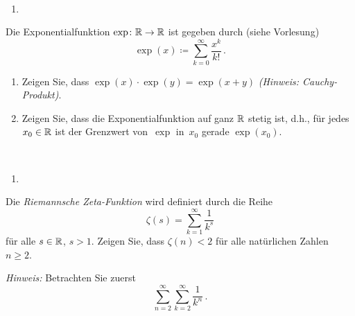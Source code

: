 \bigskip

\begin{lsg}\mbox{ }
\begin{enumerate}[label=$\mathrm{(\roman*)}$, ref=$\mathrm{\roman*}$]
\setlength{\itemsep}{4pt}
\item 
\end{enumerate}
\end{lsg}

\bigskip

\begin{aufg}[6 Punkte]
Die Exponentialfunktion $\exp\colon\mathbb{R}\to\mathbb{R}$ ist gegeben durch (siehe Vorlesung)
\[
\exp(x)\coloneqq \sum_{k=0}^{\infty}\frac{x^k}{k!}\,. 
\]
\begin{enumerate}[label=$\mathrm{(\roman*)}$, ref=$\mathrm{\roman*}$]
\item Zeigen Sie, dass $\exp(x)\cdot \exp(y)=\exp(x+y)$ \emph{(Hinweis: Cauchy-Produkt)}.
\item Zeigen Sie, dass die Exponentialfunktion auf ganz $\mathbb{R}$ stetig ist, d.h., f\"ur jedes~$x_0\in\mathbb{R}$ ist der Grenzwert von~$\exp$ in~$x_0$ gerade $\exp(x_0)$.
\end{enumerate}
\end{aufg}
 
\bigskip

\begin{lsg}\mbox{ }
\begin{enumerate}[label=$\mathrm{(\roman*)}$, ref=$\mathrm{\roman*}$]
\item 
\end{enumerate}
\end{lsg}

\bigskip


\begin{aufg}[6 Punkte]
Die \textit{Riemannsche Zeta-Funktion} wird definiert durch die Reihe 
\[
\zeta(s) = \sum_{k=1}^{\infty} \frac{1}{k^{s}}
\]
f\"ur alle $s\in \mathbb{R}$, $s>1$. Zeigen Sie, dass $\zeta(n) < 2$ f\"ur alle nat\"urlichen Zahlen $n\geq 2$. 

\noindent
\emph{Hinweis:} Betrachten Sie zuerst
\[
\sum_{n=2}^{\infty} \sum_{k=2}^{\infty} \frac{1}{k^{n}}\,.
\]
\end{aufg}


\bigskip

\begin{lsg} 
\end{lsg}
 
\bigskip

